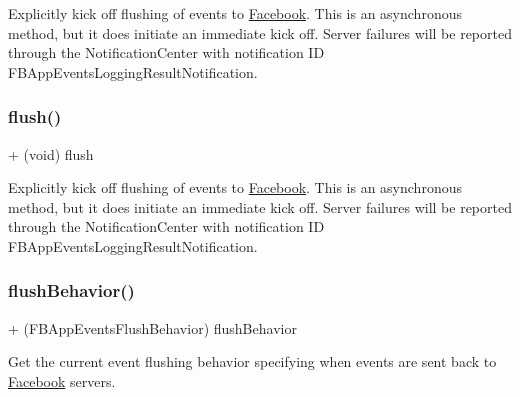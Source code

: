 Explicitly kick off flushing of events to \hyperlink{interfaceFacebook}{Facebook}. This is an asynchronous method, but it does initiate an immediate kick off. Server failures will be reported through the Notification\+Center with notification ID {\ttfamily F\+B\+App\+Events\+Logging\+Result\+Notification}. \mbox{\label{interfaceFBAppEvents_a0475c0b929152f9be2b7428312382747}} 
\subsubsection{\texorpdfstring{flush()}{flush()}\hspace{0.1cm}{\footnotesize\ttfamily [5/5]}}
{\footnotesize\ttfamily + (void) flush \begin{DoxyParamCaption}{ }\end{DoxyParamCaption}}

Explicitly kick off flushing of events to \hyperlink{interfaceFacebook}{Facebook}. This is an asynchronous method, but it does initiate an immediate kick off. Server failures will be reported through the Notification\+Center with notification ID {\ttfamily F\+B\+App\+Events\+Logging\+Result\+Notification}. \mbox{\label{interfaceFBAppEvents_af9b7ac67d5b3587f7dc452ba2129fe85}} 
\subsubsection{\texorpdfstring{flush\+Behavior()}{flushBehavior()}\hspace{0.1cm}{\footnotesize\ttfamily [1/5]}}
{\footnotesize\ttfamily + (F\+B\+App\+Events\+Flush\+Behavior) flush\+Behavior \begin{DoxyParamCaption}{ }\end{DoxyParamCaption}}

Get the current event flushing behavior specifying when events are sent back to \hyperlink{interfaceFacebook}{Facebook} servers. \mbox{\label{interfaceFBAppEvents_af9b7ac67d5b3587f7dc452ba2129fe85}} 
